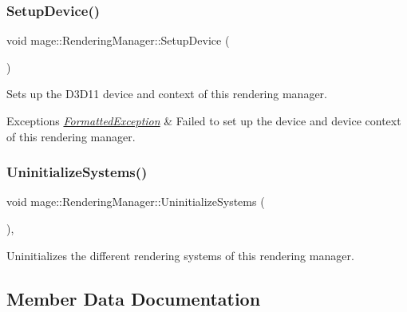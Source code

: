 \subsubsection{\texorpdfstring{Setup\+Device()}{SetupDevice()}}
{\footnotesize\ttfamily void mage\+::\+Rendering\+Manager\+::\+Setup\+Device (\begin{DoxyParamCaption}{ }\end{DoxyParamCaption})\hspace{0.3cm}{\ttfamily [private]}}

Sets up the D3\+D11 device and context of this rendering manager.


\begin{DoxyExceptions}{Exceptions}
{\em \hyperlink{classmage_1_1_formatted_exception}{Formatted\+Exception}} & Failed to set up the device and device context of this rendering manager. \\
\hline
\end{DoxyExceptions}
\hypertarget{classmage_1_1_rendering_manager_a3665d58d2a9e8995a348b5f2bd723d8b}{}\label{classmage_1_1_rendering_manager_a3665d58d2a9e8995a348b5f2bd723d8b} 
\subsubsection{\texorpdfstring{Uninitialize\+Systems()}{UninitializeSystems()}}
{\footnotesize\ttfamily void mage\+::\+Rendering\+Manager\+::\+Uninitialize\+Systems (\begin{DoxyParamCaption}{ }\end{DoxyParamCaption})\hspace{0.3cm}{\ttfamily [private]}, {\ttfamily [noexcept]}}

Uninitializes the different rendering systems of this rendering manager. 

\subsection{Member Data Documentation}
\hypertarget{classmage_1_1_rendering_manager_adeb8bcb91a132686d683b33af46979f8}{}\label{classmage_1_1_rendering_manager_adeb8bcb91a132686d683b33af46979f8} 
